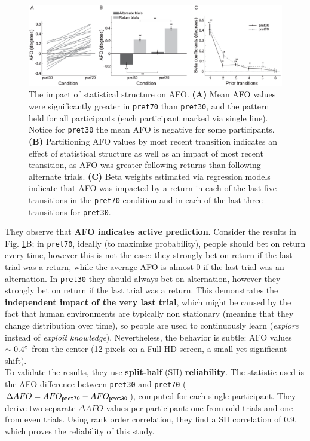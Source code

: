 \begin{figure}[!ht]
    \centering
    \captionsetup{width=.8\linewidth}
    \includegraphics[width=0.9\linewidth]{images/afo_2.png}
    \caption{The impact of statistical structure on AFO. \textbf{(A)} Mean AFO values were significantly greater in \texttt{pret70} than \texttt{pret30}, and the pattern held for all participants (each participant marked via single line). Notice for \texttt{pret30} the mean AFO is negative for some participants. \textbf{(B)} Partitioning AFO values by most recent transition indicates an effect of statistical structure as well as an impact of most recent transition, as AFO was greater following returns than following alternate trials. \textbf{(C)} Beta weights estimated via regression models indicate that AFO was impacted by a return in each of the last five transitions in the \texttt{pret70} condition and in each of the last three transitions for \texttt{pret30}.}
    \label{fig:afo_2}
\end{figure}

They observe that \textbf{AFO indicates active prediction}. Consider the results in Fig. \ref{fig:afo_2}B; in \texttt{pret70}, ideally (to maximize probability), people should bet on return every time, however this is not the case: they strongly bet on return if the last trial was a return, while the average AFO is almost 0 if the last trial was an alternation. In \texttt{pret30} they should always bet on alternation, however they strongly bet on return if the last trial was a return. This demonstrates the \textbf{independent impact of the very last trial}, which might be caused by the fact that human environments are typically non stationary (meaning that they change distribution over time), so people are used to continuously learn (\textit{explore} instead of \textit{exploit knowledge}). Nevertheless, the behavior is subtle: AFO values $\sim 0.4\degree$ from the center (12 pixels on a Full HD screen, a small yet significant shift).\\

To validate the results, they use \textbf{split-half} (SH) \textbf{reliability}. The statistic used is the AFO difference between \texttt{pret30} and \texttt{pret70} ($\Delta AFO = AFO_{\text{\texttt{pret70}}} - AFO_{\text{\texttt{pret30}}}$), computed for each single participant. They derive two separate $\Delta AFO$ values per participant: one from odd trials and one from even trials. Using rank order correlation, they find a SH correlation of 0.9, which proves the reliability of this study.

